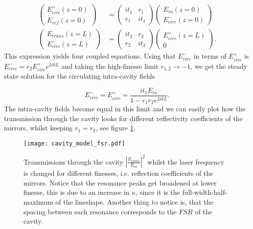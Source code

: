 \begin{subequations}
\begin{align}
\begin{pmatrix}
E_{circ}^{+}(z = 0) \\
E_{ref}(z = 0)
\end{pmatrix}
 & =
\begin{pmatrix}
it_1 & r_1 \\
r_1 & it_1
\end{pmatrix} 
\begin{pmatrix}
E_{in}(z = 0) \\
E_{circ}^{-}(z = 0)
\end{pmatrix} \\
\begin{pmatrix}
E_{trans}(z = L) \\
E_{circ}^{-}(z = L)
\end{pmatrix}
 & =
\begin{pmatrix}
it_2 & r_2 \\
r_2 & it_2
\end{pmatrix}
\begin{pmatrix}
E_{circ}^{+}(z = L) \\
0
\end{pmatrix}.
\end{align}
\label{eq:E-field_transfer}
\end{subequations}
\noindent
This expression yields four coupled equations. Using that $E_{circ}^-$ in terms of $E_{circ}^+$ is $E_{circ}^- = r_2E_{circ}^+e^{2ikL}$ and taking the high-finesse limit $r_{1,2} \rightarrow -1$, we get the steady state solution for the circulating intra-cavity fields

\begin{equation}
E_{circ}^- = E_{circ}^+ = \frac{it_1 E_{in}}{1 - r_1r_2e^{2ikL}}.
\label{eq:high_finesse_approx}
\end{equation}
\noindent
The intra-cavity fields become equal in this limit and we can easily plot how the transmission through the cavity looks for different reflectivity coefficients of the mirrors, whilst keeping $r_1 = r_2$, see figure \ref{fig:trans_curve_finesse}.

\begin{figure}[H]
\centering
\texttt{[image: cavity\_model\_fsr.pdf]}
\caption{Transmissions through the cavity $\left| \frac{E_{trans}}{E_{in}} \right|^2$ whilst the laser frequency is changed for different finesses, i.e. reflection coefficients of the mirrors. Notice that the resonance peaks get broadened at lower finesse, this is due to an increase in $\kappa$, since it is the full-width-half-maximum of the lineshape. Another thing to notice is, that the spacing between each resonance corresponds to the $FSR$ of the cavity.}
\label{fig:trans_curve_finesse}
\end{figure}

